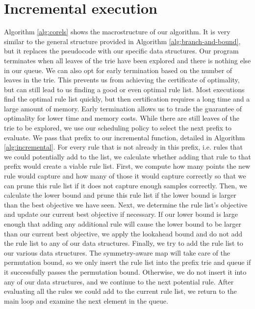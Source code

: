 \section{Incremental execution}
Algorithm \ref{alg:corels} shows the macrostructure of our algorithm.
It is very similar to the general structure provided in Algorithm \ref{alg:branch-and-bound}, but it replaces the pseudocode with our specific data structures. 
Our program terminates when all leaves of the trie have been explored and there is nothing else in our queue.
We can also opt for early termination based on the number of leaves in the trie.
This prevents us from achieving the certificate of optimality, but can still lead to us finding a good or even optimal rule list.
Most executions find the optimal rule list quickly, but then certification requires a long time and a large amount of memory.
Early termination allows us to trade the guarantee of optimality for lower time and memory costs.
While there are still leaves of the trie to be explored, we use our scheduling policy to select the next prefix to evaluate.
We pass that prefix to our incremental function, detailed in Algorithm \ref{alg:incremental}.
For every rule that is not already in this prefix, i.e. rules that we could potentially add to the list, we calculate whether adding that rule to that prefix would create a viable rule list.
First, we compute how many points the new rule would capture and how many of those it would capture correctly so that we can prune this rule list if it does not capture enough samples correctly.
Then, we calculate the lower bound and prune this rule list if the lower bound is larger than the best objective we have seen.
Next, we determine the rule list's objective and update our current best objective if necessary.
If our lower bound is large enough that adding any additional rule will cause the lower bound to be larger than our current best objective, we apply the lookahead bound and do not add the rule list to any of our data structures.
Finally, we try to add the rule list to our various data structures.
The symmetry-aware map will take care of the permutation bound, so we only insert the rule list into the prefix trie and queue if it successfully passes the permutation bound.
Otherwise, we do not insert it into any of our data structures, and we continue to the next potential rule.%
After evaluating all the rules we could add to the current rule list, we return to the main loop and examine the next element in the queue.

